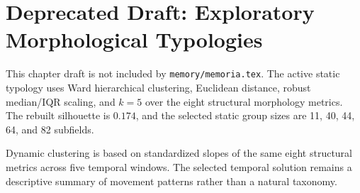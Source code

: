 
\section{Deprecated Draft: Exploratory Morphological Typologies}

This chapter draft is not included by \texttt{memory/memoria.tex}. The active
static typology uses Ward hierarchical clustering, Euclidean distance, robust
median/IQR scaling, and \(k=5\) over the eight structural morphology metrics.
The rebuilt silhouette is \(0.174\), and the selected static group sizes are
11, 40, 44, 64, and 82 subfields.

Dynamic clustering is based on standardized slopes of the same eight structural
metrics across five temporal windows. The selected temporal solution remains a
descriptive summary of movement patterns rather than a natural taxonomy.
